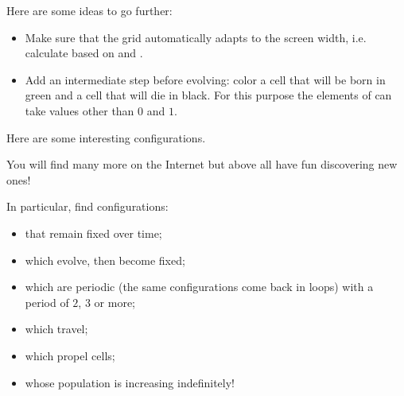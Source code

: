 \documentclass[11pt,class=report,crop=false]{standalone}
\begin{document}
Here are some ideas to go further:
\begin{itemize}
  \item Make sure that the grid automatically adapts to the screen width, i.e. calculate  based on  and .
  
  \item Add an intermediate step before evolving: color  a cell that will be born  in green and a cell that will die in black. For this purpose the elements of  can take values other than $0$ and $1$.
\end{itemize}

Here are some interesting configurations. 

You will find many more on the Internet but above all have fun discovering new ones!

In particular, find configurations:
\begin{itemize}
  \item that remain fixed over time;
  \item which evolve, then become fixed;
  \item which are periodic (the same configurations come back in loops) with a period of $2$, $3$ or more;
  \item which travel;
  \item which propel cells; 
  \item whose population is increasing indefinitely!
\end{itemize}
\end{document}
